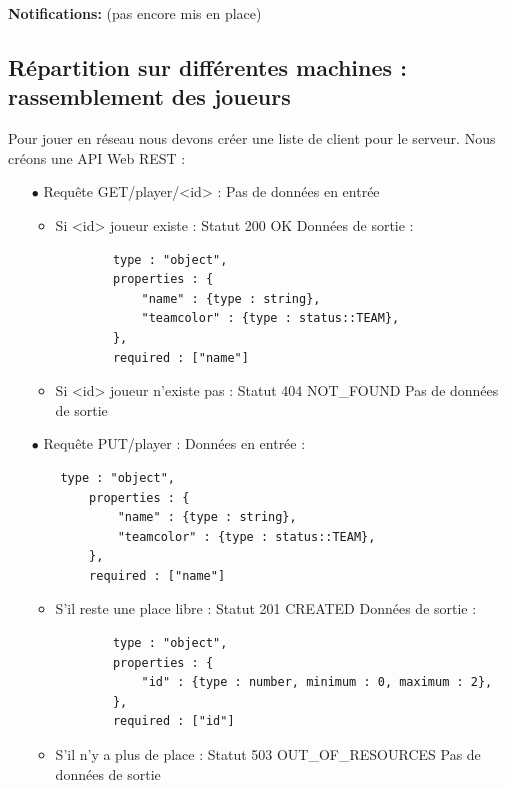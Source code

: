 \documentclass[12pt]{report}
\begin{document}
\paragraphe{}\textbf{Notifications:} (pas encore mis en place)

\subsection{Répartition sur différentes machines : rassemblement des joueurs}
\paragraphe{}Pour jouer en réseau nous devons créer une liste de client pour le serveur. Nous créons une API Web REST :
\newline
\begin{itemize}
    \item[$\bullet$] Requête GET/player/<id> : Pas de données en entrée
    \begin{itemize}
        \item Si <id> joueur existe : Statut 200 OK
        \newline Données de sortie : 
        \begin{verbatim} 
        type : "object",
        properties : {
            "name" : {type : string},
            "teamcolor" : {type : status::TEAM},
        },
        required : ["name"] \end{verbatim} 
        \item Si <id> joueur n'existe pas : Statut 404 NOT\_FOUND
        \newline Pas de données de sortie
    \end{itemize}  
\newpage

    \item[$\bullet$] Requête PUT/player :
    \newline Données en entrée :
    \begin{verbatim} 
    type : "object",
        properties : {
            "name" : {type : string},
            "teamcolor" : {type : status::TEAM},
        },
        required : ["name"] \end{verbatim}
    \begin{itemize}
        \item S'il reste une place libre : Statut 201 CREATED
        \newline Données de sortie : 
        \begin{verbatim} 
        type : "object",
        properties : {
            "id" : {type : number, minimum : 0, maximum : 2},
        },
        required : ["id"] \end{verbatim}
        \item S'il n'y a plus de place : Statut 503 OUT\_OF\_RESOURCES
        \newline Pas de données de sortie
    \end{itemize}
    

\end{itemize}
\end{document}

